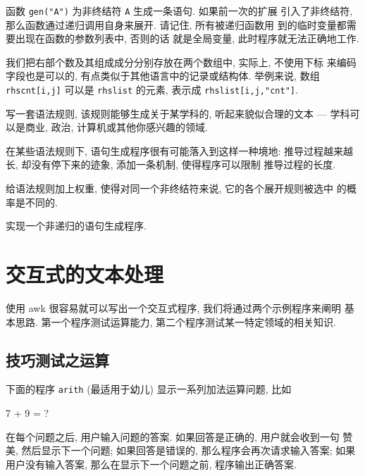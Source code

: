 函数 \texttt{gen("A")} 为非终结符 \texttt{A} 生成一条语句. 如果前一次的扩展
引入了非终结符, 那么函数通过递归调用自身来展开. 请记住, 所有被递归函数用%
%
到的临时变量都需要出现在函数的参数列表中, 否则的话
就是全局变量, 此时程序就无法正确地工作.

我们把右部个数及其组成成分分别存放在两个数组中, 实际上, 不使用下标
来编码字段也是可以的, 有点类似于其他语言中的记录或结构体. 
举例来说, 数组 \texttt{rhscnt[i,j]} 可以是 \texttt{rhslist} 的元素,
表示成 \texttt{rhslist[i,j,"cnt"]}.

\begin{exercise}
    写一套语法规则, 该规则能够生成关于某学科的, 听起来貌似合理的文本 ---
    学科可以是商业, 政治, 计算机或其他你感兴趣的领域.
\end{exercise}

\begin{exercise}
    \label{exer:length_limit}
    在某些语法规则下, 语句生成程序很有可能落入到这样一种境地:
    推导过程越来越长, 却没有停下来的迹象, 添加一条机制, 使得程序可以限制
    推导过程的长度.
\end{exercise}

\begin{exercise}
    \label{exer:weight}
    给语法规则加上权重, 使得对同一个非终结符来说, 它的各个展开规则被选中
    的概率是不同的.
\end{exercise}

\begin{exercise}
    \label{exer:nonrecursive}
    实现一个非递归的语句生成程序.
\end{exercise}

\section{交互式的文本处理}
\label{sec:interactive_text_manipulation}

使用 awk 很容易就可以写出一个交互式程序, 我们将通过两个示例程序来阐明
基本思路. 第一个程序测试运算能力, 第二个程序测试某一特定领域的相关知识.

\subsection{技巧测试之运算}
\label{subsec:skills_testing_arithmetic}

下面的程序 \texttt{arith} (最适用于幼儿) 显示一系列加法运算问题, 比如 
\begin{awkcode}
    7 + 9 = ?
\end{awkcode}
在每个问题之后, 用户输入问题的答案. 如果回答是正确的, 用户就会收到一句
赞美, 然后显示下一个问题; 如果回答是错误的, 那么程序会再次请求输入答案;
如果用户没有输入答案, 那么在显示下一个问题之前, 程序输出正确答案.

